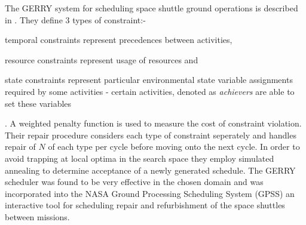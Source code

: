 \documentclass[12pt,a4paper]{article}
\begin{document}
The GERRY system for scheduling space shuttle ground operations is described in \citep{zweben94scheduling} . They define 3 types of constraint:- \begin{inparaenum} \item temporal constraints represent precedences between activities, \item resource constraints represent usage of resources and \item state constraints represent particular environmental state variable assignments required by some activities - certain activities, denoted as \emph{achievers} are able to set these variables \end{inparaenum}. A weighted penalty function is used to measure the cost of constraint violation. Their repair procedure considers each type of constraint seperately and handles repair of $N$ of each type per cycle before moving onto the next cycle. In order to avoid trapping at local optima in the search space they employ simulated annealing to determine acceptance of a newly generated schedule. %
The GERRY scheduler was found to be very effective in the chosen domain and was incorporated into the NASA Ground Processing Scheduling System (GPSS) an interactive tool for scheduling repair and refurbishment of the space shuttles between missions. 
\end{document}
